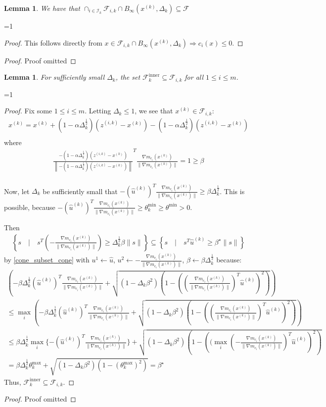 \documentclass{article}
\newtheorem{lemma}[theorem]{Lemma}
\theoremstyle{case}
\newcommand{\xk}{{x^{(k)}}}
\newcommand{\dk}{\Delta_k}
\newcommand{\feasible}{{\mathcal F}}
\newcommand{\zik}{{z^{(i, k)}}}
\newcommand{\fik}{{\mathcal F_{i, k}}}
\newcommand{\iik}{{\mathcal I_{k}}}
\newcommand{\huk}{{{\hat u}^{(k)}}}
\newcommand{\fcki}{{\mathcal {F}^{\text{inner}}_k}}
\newcommand{\gmcik}{{\nabla m_{c_i}(\xk)}}
\newcommand{\hgik}{{\frac{\nabla m_{c_i}(\xk)}{\|\nabla m_{c_i}(\xk)\|}}}
\newcommand{\tr}{{ B_{\infty}\left(\xk, \dk\right) }}
\def\includeproofs{1}
\begin{document}
\begin{lemma}
We have that $\cap_{i \in \iik} \fik \cap \tr \subseteq \feasible$ 
\end{lemma}

\ifnum\includeproofs=1
\begin{proof}
This follows directly from $x \in \fik \cap \tr \Longrightarrow c_i(x) \le 0$.
\end{proof}
\else
\begin{proof}
Proof omitted
\end{proof}
\fi

\begin{lemma}
For sufficiently small $\dk$, the set $\fcki \subseteq \fik$ for all $1\le i \le m$.
\end{lemma}


\ifnum\includeproofs=1
\begin{proof}
Fix some $1\le i \le m$.
Letting $\dk \le 1$, we see that $\xk \in \fik$:
\begin{align*}
\xk = \xk + \left(1 - \alpha\dk^{\frac 1 2}\right)(\zik - \xk) - \left(1 - \alpha\dk^{\frac 1 2}\right)(\zik - \xk) \\
\end{align*}
where
\begin{align*}
\frac{-\left(1 - \alpha\dk^{\frac 1 2}\right)(\zik - \xk)}{\left\|-\left(1 - \alpha\dk^{\frac 1 2}\right)(\zik - \xk)\right\|}^T\hgik = 1 \ge \beta\\
\end{align*}


Now, let $\dk$ be sufficiently small that $-(\huk)^T\hgik \ge \beta\dk^{\frac 1 2}$.
This is possible, because $ -(\huk)^T\hgik \ge \theta^{\text{min}}_k \ge \theta^{\text{min}} > 0$.

Then
\begin{align*}
\left\{s\quad | \quad s^T(-\hgik)\ge\dk^{\frac 1 2}\beta\|s\| \right\}  \subseteq \left\{s\quad | \quad s^T\huk\ge\beta^{\star}\|s\| \right\}
\end{align*}
by \cref{cone_subset_cone} with $u^1 \gets \hat u$, $u^2 \gets -\hgik$, $\beta \gets \beta \dk^{\frac 1 2 }$ because:
\begin{align*}
\left(-\beta\dk^{\frac 1 2}(\huk)^T\hgik + \sqrt{(1 - \dk\beta^2)\left(1 - \left((\hgik)^T\hat u^{(k)}\right)^2\right)}\right) \\
\le \max_i \left(-\beta\dk^{\frac 1 2}(\huk)^T{\hgik} + \sqrt{(1 - \dk\beta^2)\left(1 - \left((\hgik)^T\huk\right)^2\right)}\right) \\
\le \beta\dk^{\frac 1 2} \max_i\{-(\huk)^T\hgik\} + \sqrt{(1 - \dk\beta^2)\left(1 - \left((\max_i(-\hgik)^T\huk\right)^2\right)} \\
= \beta\dk^{\frac 1 2} \theta^{\text{max}}_k + \sqrt{(1 - \dk\beta^2)\left(1 - (\theta^{\text{max}}_k) ^2\right)} = \beta^{\star}
\end{align*}
Thus, $\fcki \subseteq \fik$.
\end{proof}
\else
\begin{proof}
Proof omitted
\end{proof}
\fi
\end{document}
